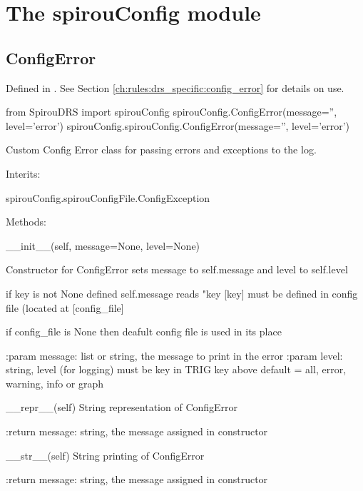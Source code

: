 
\clearpage
\newpage
\begin{minipage}{\textwidth}
\section{The spirouConfig module}
\label{ch:the_module:spirouConfig}

\subsection{ConfigError}
\label{ch:the_module:spirouConfig:ConfigError}

Defined in \spirouConfig{}.
See Section \ref{ch:rules:drs_specific:config_error} for details on use.

\begin{pythonbox}
from SpirouDRS import spirouConfig
spirouConfig.ConfigError(message='', level='error')
spirouConfig.spirouConfig.ConfigError(message='', level='error')
\end{pythonbox}

\begin{pythondocstring}
Custom Config Error class for passing errors and exceptions to the log.

Interits:

	spirouConfig.spirouConfigFile.ConfigException

Methods:

	__init__(self, message=None, level=None)

		Constructor for ConfigError sets message to self.message and level to
		self.level

		if key is not None defined self.message reads "key [key] must be
		defined in config file (located at [config_file]

		if config_file is None then deafult config file is used in its place

		:param message: list or string, the message to print in the error
		:param level: string, level (for logging) must be key in TRIG key above
		              default = all, error, warning, info or graph

	__repr__(self)
	    String representation of ConfigError
	    
	    :return message: string, the message assigned in constructor 

	__str__(self)
	    String printing of ConfigError

	    :return message: string, the message assigned in constructor

\end{pythondocstring}
\end{minipage}


